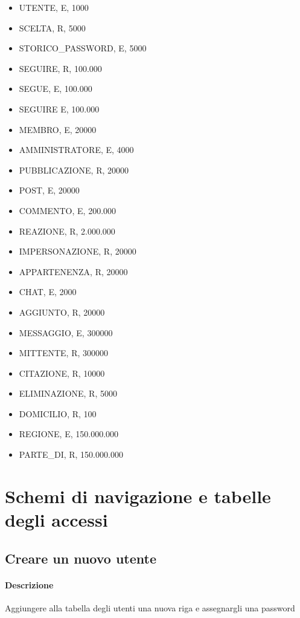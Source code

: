 \documentclass[a4paper,12pt]{report}
\begin{document}
\begin{itemize}
  \item UTENTE, E, 1000
  \item SCELTA, R, 5000
  \item STORICO\_PASSWORD, E, 5000
  \item SEGUIRE, R, 100.000
  \item SEGUE, E, 100.000
  \item SEGUIRE E, 100.000
  \item MEMBRO, E, 20000
  \item AMMINISTRATORE, E, 4000
  \item PUBBLICAZIONE, R, 20000
  \item POST, E, 20000
  \item COMMENTO, E, 200.000
  \item REAZIONE, R, 2.000.000
  \item IMPERSONAZIONE, R, 20000
  \item APPARTENENZA, R, 20000
  \item CHAT, E, 2000 
  \item AGGIUNTO, R, 20000 
  \item MESSAGGIO, E, 300000
  \item MITTENTE, R, 300000
  \item CITAZIONE, R, 10000
  \item ELIMINAZIONE, R, 5000
  \item DOMICILIO, R, 100
  \item REGIONE, E, 150.000.000
  \item PARTE\_DI, R, 150.000.000

\end{itemize}

\section{Schemi di navigazione e tabelle degli accessi}

\subsection{Creare un nuovo utente} \label{nuovo_utente}
\paragraph{Descrizione} Aggiungere alla tabella degli utenti una nuova riga e assegnargli una password 
\end{document}

